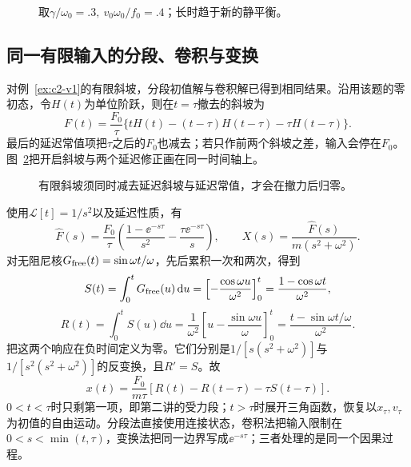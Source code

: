 \begin{solution}
\begin{figure}[H]\centering
{}
\caption{取$\gamma/\omega_0=.3,\ v_0\omega_0/f_0=.4$；长时趋于新的静平衡。}\label{fig:c4-e12-s}
\end{figure}
\end{solution}

\subsection{同一有限输入的分段、卷积与变换}
对例~\ref{ex:c2-v1}的有限斜坡，分段初值解与卷积解已得到相同结果。沿用该题的零初态，令$H(t)$为单位阶跃，则在$t=\tau$撤去的斜坡为
\[F(t)=\frac{F_0}{\tau}\{tH(t)-(t-\tau)H(t-\tau)-\tau H(t-\tau)\}.
\]
最后的延迟常值项把$\tau$之后的$F_0$也减去；若只作前两个斜坡之差，输入会停在$F_0$。图~\ref{fig:c4-ramp-decomposition}把开启斜坡与两个延迟修正画在同一时间轴上。

\begin{figure}[H]\centering
{}
\caption{有限斜坡须同时减去延迟斜坡与延迟常值，才会在撤力后归零。}\label{fig:c4-ramp-decomposition}
\end{figure}

使用$\mathcal L[t]=1/s^2$以及延迟性质，有
\[\widehat F(s)=\frac{F_0}{\tau}
\left(\frac{1-\ee^{-s\tau}}{s^2}-\frac{\tau\ee^{-s\tau}}s\right),
\qquad X(s)=\frac{\widehat F(s)}{m(s^2+\omega^2)}.\]
对无阻尼核$G_{\rm free}(t)=\sin\omega t/\omega$，先后累积一次和两次，得到
\[S(t)=\int_0^tG_{\rm free}(u)\mathop{}\!\mathrm d u
=\left[-\frac{\cos\omega u}{\omega^2}\right]_0^t
=\frac{1-\cos\omega t}{\omega^2},\]
\[R(t)=\int_0^tS(u)\dd u
=\frac1{\omega^2}\left[u-\frac{\sin\omega u}{\omega}\right]_0^t
=\frac{t-\sin\omega t/\omega}{\omega^2}.\]
把这两个响应在负时间定义为零。它们分别是$1/[s(s^2+\omega^2)]$与$1/[s^2(s^2+\omega^2)]$的反变换，且$R'=S$。故
\[\boxed{x(t)=\frac{F_0}{m\tau}
[R(t)-R(t-\tau)-\tau S(t-\tau)]}.\]
$0<t<\tau$时只剩第一项，即第二讲的受力段；$t>\tau$时展开三角函数，恢复以$x_\tau,v_\tau$为初值的自由运动。分段法直接使用连接状态，卷积法把输入限制在$0<s<\min(t,\tau)$，变换法把同一边界写成$\ee^{-s\tau}$；三者处理的是同一个因果过程。

